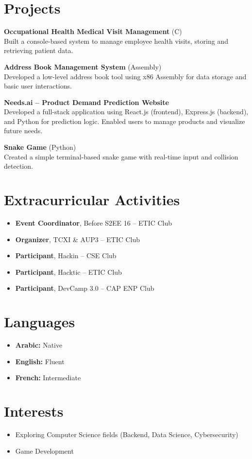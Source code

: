 \documentclass[a4paper,10pt]{article}
\begin{document}
\section*{Projects}
\textbf{Occupational Health Medical Visit Management} (C) \\
Built a console-based system to manage employee health visits, storing and retrieving patient data.

\textbf{Address Book Management System} (Assembly) \\
Developed a low-level address book tool using x86 Assembly for data storage and basic user interactions.

\textbf{Needs.ai – Product Demand Prediction Website} \\
Developed a full-stack application using React.js (frontend), Express.js (backend), and Python for prediction logic. Enabled users to manage products and visualize future needs.

\textbf{Snake Game} (Python) \\
Created a simple terminal-based snake game with real-time input and collision detection.

\section*{Extracurricular Activities}
\begin{itemize}
    \item \textbf{Event Coordinator}, Before S2EE 16 – ETIC Club
    \item \textbf{Organizer}, TCXI \& AUP3 – ETIC Club
    \item \textbf{Participant}, Hackin – CSE Club
    \item \textbf{Participant}, Hacktic – ETIC Club
    \item \textbf{Participant}, DevCamp 3.0 – CAP ENP Club
\end{itemize}

\begin{minipage}[t]{0.48\textwidth}
\section*{Languages}
\begin{itemize}
    \item \textbf{Arabic:} Native
    \item \textbf{English:} Fluent
    \item \textbf{French:} Intermediate
\end{itemize}
\end{minipage}
\hfill
\begin{minipage}[t]{0.49\textwidth}
\section*{Interests}
\begin{itemize}
    \item Exploring Computer Science fields (Backend, Data Science, Cybersecurity)
    \item Game Development
\end{itemize}
\end{minipage}
\end{document}
